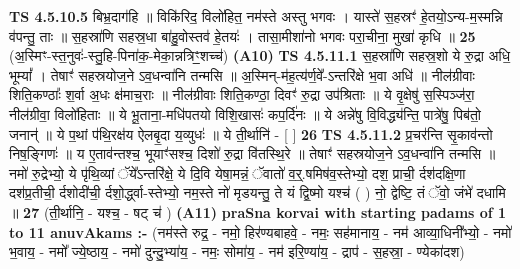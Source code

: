 \documentclass[17pt]{extarticle}
\begin{document}
                  \newline
                                \textbf{ TS 4.5.10.5} \newline
                  बिभ्र॒दाग॑हि ॥ विकि॑रिद॒ विलो॑हित॒ नम॑स्ते अस्तु भगवः । यास्ते॑ स॒हस्रꣳ॑ हे॒तयो॒ऽन्य-म॒स्मन्नि व॑पन्तु॒ ताः ॥                            स॒हस्रा॑णि सहस्र॒धा बा॑हु॒वोस्तव॑ हे॒तयः॑ । तासा॒मीशा॑नो भगवः परा॒चीना॒ मुखा॑ कृधि ॥ \textbf{  25 } \newline
                  \newline
                      (अ॒स्मिꣳ-स्त॒नुवः॑-स्तु॒हि-पिना॑क॒-मेका॒न्नत्रिꣳ॒॒शच्च॑)  \textbf{(A10)} \newline \newline
                                        \textbf{ TS 4.5.11.1} \newline
                  स॒हस्रा॑णि सहस्र॒शो ये रु॒द्रा अधि॒ भूम्यां᳚ । तेषाꣳ॑ सहस्रयोज॒ने ऽव॒धन्वा॑नि तन्मसि ॥                                      अ॒स्मिन्-म॑ह॒त्य॑र्ण॒वे᳚-ऽन्तरि॑क्षे भ॒वा अधि॑ ॥                                     नील॑ग्रीवाः शिति॒कण्ठाः᳚ श॒र्वा अ॒धः क्ष॑माच॒राः ॥                                नील॑ग्रीवाः शिति॒कण्ठा॒ दिवꣳ॑ रु॒द्रा उप॑श्रिताः ॥                         ये वृ॒क्षेषु॑ स॒स्पिञ्ज॑रा॒ नील॑ग्रीवा॒ विलो॑हिताः ॥                                        ये भू॒ताना॒-मधि॑पतयो विशि॒खासः॑ कप॒र्दि॑नः ॥                                    ये अन्ने॑षु वि॒विद्ध्य॑न्ति॒ पात्रे॑षु॒ पिब॑तो॒ जनान्॑ ॥                                       ये प॒थां प॑थि॒रक्ष॑य ऐलबृ॒दा य॒व्युधः॑ ॥ ये ती॒र्थानि॑ - [  ] \textbf{  26} \newline
                  \newline
                                \textbf{ TS 4.5.11.2} \newline
                  प्र॒चर॑न्ति सृ॒काव॑न्तो निष॒ङ्गिणः॑ ॥                                     य ए॒ताव॑न्तश्च॒ भूयाꣳ॑सश्च॒ दिशो॑ रु॒द्रा वि॑तस्थि॒रे ॥ तेषाꣳ॑ सहस्रयोज॒ने ऽव॒धन्वा॑नि तन्मसि ॥                                              नमो॑ रु॒द्रेभ्यो॒ ये पृ॑थि॒व्यां ॅये᳚ऽन्तरि॑क्षे॒ ये दि॒वि येषा॒मन्नं॒ ॅवातो॑ व॒र्॒.षमिष॑व॒स्तेभ्यो॒ दश॒ प्राची॒ र्दश॑दक्षि॒णा दश॑प्र॒तीची॒ र्दशोदी॑ची॒ र्दशो॒र्द्ध्वा-स्तेभ्यो॒ नम॒स्ते नो॑ मृडयन्तु॒ ते यं द्वि॒ष्मो यश्च॑ ( ) नो॒ द्वेष्टि॒ तं ॅवो॒ जंभे॑ दधामि ॥ \textbf{  27} \newline
                  \newline
                      (ती॒र्थानि॒ - यश्च॒ - षट् च॑ )  \textbf{(A11)} \newline \newline
                \textbf{praSna korvai with starting padams of 1 to 11 anuvAkams :-} \newline
        (नम॑स्ते रुद्र॒ - नमो॒ हिर॑ण्यबाहवे॒ - नमः॒ सह॑मानाय॒ - नम॑ आव्या॒धिनी᳚भ्यो॒ - नमो॑ भ॒वाय॒ - नमो᳚ ज्ये॒ष्ठाय॒ - नमो॑ दुन्दु॒भ्या॑य॒ - नमः॒ सोमा॑य॒ - नम॑ इरि॒ण्या॑य॒ - द्राप॑ - स॒हस्रा॒ - ण्येका॑दश) \newline
\end{document}
